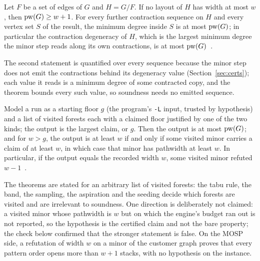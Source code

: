 \begin{theorem}\label{thm:tabu-floor}
Let $F$ be a set of edges of $G$ and $H=G/F$. If no layout of $H$ has width
at most $w$, then $\mathrm{pw}(G)\ge w+1$. For every further contraction sequence
on $H$ and every vertex set $S$ of the result, the minimum degree inside $S$
is at most $\mathrm{pw}(G)$; in particular the contraction degeneracy of $H$, which
is the largest minimum degree the minor step reads along its own
contractions, is at most $\mathrm{pw}(G)$~.
\end{theorem}

The second statement is quantified over every sequence because the minor
step does not emit the contractions behind its degeneracy value
(Section~\ref{sec:certs}); each value it reads is a minimum degree of some
contracted copy, and the theorem bounds every such value, so soundness needs
no emitted sequence.

\begin{theorem}\label{thm:tabu-run}
Model a run as a starting floor $g$ (the program's \texttt{-L} input, trusted
by hypothesis) and a list of visited forests each with a claimed floor
justified by one of the two kinds; the output is the largest claim, or $g$.
Then the output is at most $\mathrm{pw}(G)$; and for $w>g$, the output is at least
$w$ if and only if some visited minor carries a claim of at least $w$, in
which case that minor has pathwidth at least $w$. In particular, if the
output equals the recorded width $w$, some visited minor refuted
$w-1$~.
\end{theorem}

The theorems are stated for an arbitrary list of visited forests: the tabu
rule, the band, the sampling, the aspiration and the seeding decide which
forests are visited and are irrelevant to soundness. One direction is
deliberately not claimed: a visited minor whose pathwidth is $w$ but on which
the engine's budget ran out is not reported, so the hypothesis is the
certified claim and not the bare property; the check below confirmed that the
stronger statement is false. On the MOSP side, a refutation of width $w$ on
a minor of the customer graph proves that every pattern order opens more than
$w+1$ stacks, with no hypothesis on the instance.

